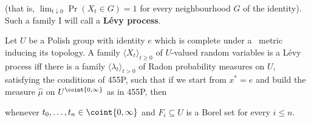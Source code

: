 
\noindent (that is, $\lim_{t\downarrow 0}\Pr(X_t\in G)=1$ for every
neighbourhood $G$ of the identity).
   Such a family I will call a
{\bf L\'evy process}.

 Let $U$ be a Polish group
with identity $e$
which is complete under a \rti\ metric inducing its topology.
A family $\langle X_t\rangle_{t\ge 0}$
of $U$-valued random variables is a L\'evy process
iff there is a family $\langle\lambda_t\rangle_{t>0}$ of Radon probability
measures on
$U$, satisfying the conditions of 455P, such that if we start from $x^*=e$
and build the measure $\hat\mu$ on $U^{\coint{0,\infty}}$ as in 455P, then


\noindent whenever $t_0,\ldots,t_n\in\coint{0,\infty}$ and $F_i\subseteq U$
is a Borel set for every $i\le n$.

